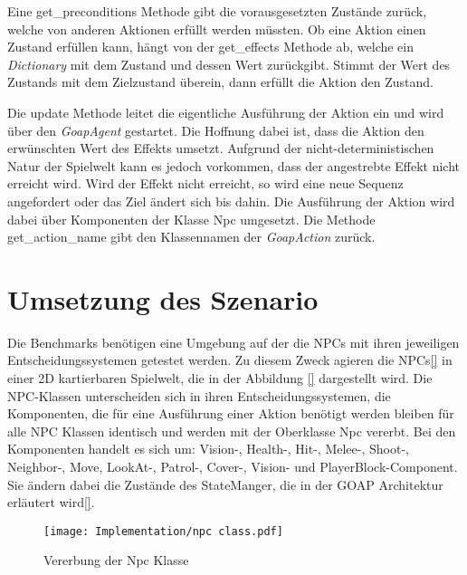 Eine get\_preconditions Methode gibt die vorausgesetzten Zustände zurück, welche von anderen Aktionen erfüllt werden müssten. Ob eine Aktion einen Zustand erfüllen kann, hängt von der get\_effects Methode ab, welche ein \textit{Dictionary} mit dem Zustand und dessen Wert zurückgibt. Stimmt der Wert des Zustands mit dem Zielzustand überein, dann erfüllt die Aktion den Zustand.

Die update Methode leitet die eigentliche Ausführung der Aktion ein und wird über den \textit{GoapAgent} gestartet. Die Hoffnung dabei ist, dass die Aktion den erwünschten Wert des Effekts umsetzt. Aufgrund der nicht-deterministischen Natur der Spielwelt kann es jedoch vorkommen, dass der angestrebte Effekt nicht erreicht wird. Wird der Effekt nicht erreicht, so wird eine neue Sequenz angefordert oder das Ziel ändert sich bis dahin. Die Ausführung der Aktion wird dabei über Komponenten der Klasse Npc umgesetzt. Die Methode get\_action\_name gibt den Klassennamen der \textit{GoapAction} zurück.










\section{Umsetzung des Szenario}
\label{chap:implementierung szenario}

Die Benchmarks benötigen eine Umgebung auf der die NPCs mit ihren jeweiligen Entscheidungssystemen getestet werden. Zu diesem Zweck agieren die NPCs\ref{} in einer 2D kartierbaren Spielwelt, die in der Abbildung \ref{} dargestellt wird. Die NPC-Klassen unterscheiden sich in ihren Entscheidungssystemen, die Komponenten, die für eine Ausführung einer Aktion benötigt werden bleiben für alle NPC Klassen identisch und werden mit der Oberklasse Npc vererbt. Bei den Komponenten handelt es sich um: Vision-, Health-, Hit-, Melee-, Shoot-, Neighbor-, Move, LookAt-, Patrol-, Cover-, Vision- und PlayerBlock-Component. Sie ändern dabei die Zustände des StateManger, die in der GOAP Architektur erläutert wird\ref{}.

\begin{figure}[h]
  \centering
  \texttt{[image: Implementation/npc class.pdf]}
	\captionsetup{justification=justified, format=plain}
  \caption{Vererbung der Npc Klasse}
  \label{fig:npc class}
\end{figure}

